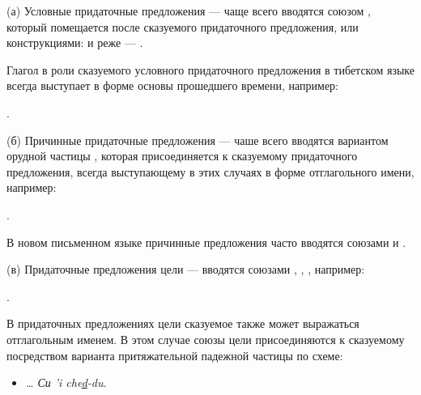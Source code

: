 (а) Условные придаточные предложения --- чаще всего вводятся союзом , который помещается после сказуемого придаточного предложения, или конструкциями:
 и реже --- .

Глагол в роли сказуемого условного придаточного предложения в тибетском языке всегда выступает в форме основы прошедшего времени, например:
\begin{prfsample}
	\item {}.
\end{prfsample}

(б) Причинные придаточные предложения --- чаше всего вводятся вариантом орудной частицы , которая присоединяется к сказуемому придаточного предложения, всегда выступающему в этих случаях в форме отглагольного имени, например:
\begin{prfsample}
	\item {}.
\end{prfsample}

В новом письменном языке причинные предложения часто вводятся союзами  и .

(в) Придаточные предложения цели --- вводятся союзами , , , например:
\begin{prfsample}
	\item {}.
\end{prfsample}
В придаточных предложениях цели сказуемое также может выражаться отглагольным именем. В этом случае союзы цели присоединяются к сказуемому посредством варианта притяжательной падежной частицы  по схеме:
\begin{itemize}
	\item \emph{\ldots{} Си 'i che\ul{d}-du}.
\end{itemize}

